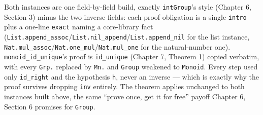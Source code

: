 Both instances are one field-by-field build, exactly \texttt{intGroup}'s style (Chapter 6, Section 3) minus the two inverse fields: each proof obligation is a single \texttt{intro} plus a one-line \texttt{exact} naming a core-library fact (\texttt{List.append\_\allowbreak{}assoc}/\texttt{List.nil\_\allowbreak{}append}/\texttt{List.append\_\allowbreak{}nil} for the list instance, \texttt{Nat.mul\_\allowbreak{}assoc}/\texttt{Nat.one\_\allowbreak{}mul}/\texttt{Nat.mul\_\allowbreak{}one} for the natural-number one). \texttt{monoid\_\allowbreak{}id\_\allowbreak{}unique}'s proof is \texttt{id\_\allowbreak{}unique} (Chapter 7, Theorem 1) copied verbatim, with every \texttt{Grp.} replaced by \texttt{Mn.} and \texttt{Group} weakened to \texttt{Monoid}. Every step used only \texttt{id\_\allowbreak{}right} and the hypothesis \texttt{h}, never an inverse --- which is exactly why the proof survives dropping \texttt{inv} entirely. The theorem applies unchanged to both instances built above, the same ``prove once, get it for free'' payoff Chapter 6, Section 6 promises for \texttt{Group}.
